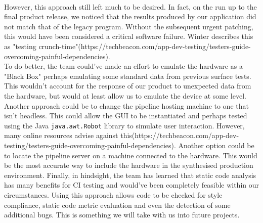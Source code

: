\documentclass{l3proj}
\begin{document}
\\However, this approach still left much to be desired. In fact, on the run up to the final product release, we noticed that the results produced by our application did not match that of the legacy program. Without the subsequent urgent patching, this would have been considered a critical software failure. Winter describes this as "testing crunch-time"(https://techbeacon.com/app-dev-testing/testers-guide-overcoming-painful-dependencies). 
\\To do better, the team could've made an effort to emulate the hardware as a "Black Box" perhaps emulating some standard data from previous surface tests. This wouldn't account for the response of our product to unexpected data from the hardware, but would at least allow us to emulate the device at some level. Another approach could be to change the pipeline hosting machine to one that isn't headless. This could allow the GUI to be instantiated and perhaps tested using the Java \verb|java.awt.Robot| library to simulate user interaction. However, many online resources advise against this(https://techbeacon.com/app-dev-testing/testers-guide-overcoming-painful-dependencies).
Another option could be to locate the pipeline server on a machine connected to the hardware. This would be the most accurate way to include the hardware in the synthesised production environment. Finally, in hindsight, the team has learned that static code analysis has many benefits for CI testing and would've been completely feasible within our circumstances. Using this approach allows code to be checked for style compliance, static code metric evaluation and even the detection of some additional bugs. This is something we will take with us into future projects.


\end{document}
